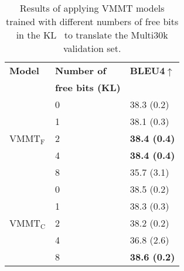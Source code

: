 \documentclass[11pt,a4paper]{article}
\newcommand{\cond}{VMMT$_{\text{C}}$\xspace}
\newcommand{\uncond}{VMMT$_{\text{F}}$\xspace}
\begin{document}
\begin{table}[t!]
\centering
\begin{tabular}{lll}
\toprule
{\bf Model} & {\bf Number of} & \bf BLEU4$\uparrow$ \\
			& {\bf free bits (KL)} &				\\
\midrule

\multirow{5}{*}{\uncond}	& 0 & 38.3 (0.2)  \\
									& 1 & 38.1 (0.3)  \\
									& 2 & {\bf 38.4 (0.4) }  \\
									& 4 & {\bf 38.4 (0.4) }  \\
									& 8 & 35.7 (3.1)  \\
\midrule
\multirow{5}{*}{\cond}	& 0 & 38.5 (0.2)  \\
									& 1 & 38.3 (0.3)  \\
									& 2 & 38.2 (0.2)  \\
									& 4 & 36.8 (2.6)  \\
									& 8 & {\bf 38.6 (0.2) } \\

\bottomrule
\end{tabular}
\caption{Results of applying VMMT models trained with different numbers of free bits in the KL~\citep{Kingmaetal2016} to translate the Multi30k validation set.}
\label{tab:kl_free_bits}
\end{table}
\end{document}
